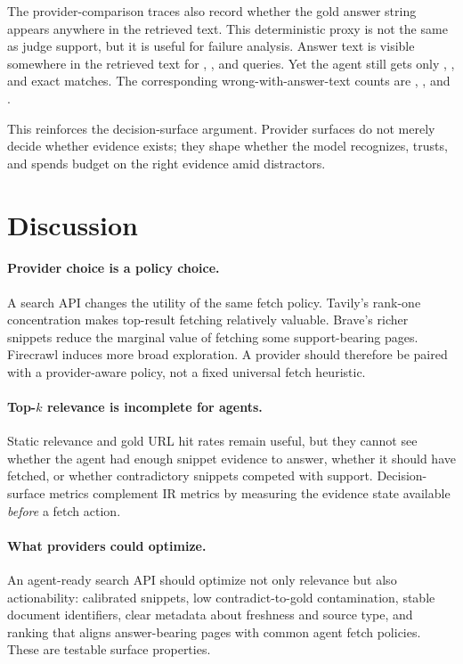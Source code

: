 The provider-comparison traces also record whether the gold answer string appears anywhere in the retrieved text. This deterministic proxy is not the same as judge support, but it is useful for failure analysis. Answer text is visible somewhere in the retrieved text for \BraveAnswerAvailable{}, \TavilyAnswerAvailable{}, and \FirecrawlAnswerAvailable{} queries. Yet the agent still gets only \BraveEM{}, \TavilyEM{}, and \FirecrawlEM{} exact matches. The corresponding wrong-with-answer-text counts are \BraveWrongWithAnswer{}, \TavilyWrongWithAnswer{}, and \FirecrawlWrongWithAnswer{}.

This reinforces the decision-surface argument. Provider surfaces do not merely decide whether evidence exists; they shape whether the model recognizes, trusts, and spends budget on the right evidence amid distractors.

\section{Discussion}
\label{sec:discussion}

\paragraph{Provider choice is a policy choice.}
A search API changes the utility of the same fetch policy. Tavily's rank-one concentration makes top-result fetching relatively valuable. Brave's richer snippets reduce the marginal value of fetching some support-bearing pages. Firecrawl induces more broad exploration. A provider should therefore be paired with a provider-aware policy, not a fixed universal fetch heuristic.

\paragraph{Top-$k$ relevance is incomplete for agents.}
Static relevance and gold URL hit rates remain useful, but they cannot see whether the agent had enough snippet evidence to answer, whether it should have fetched, or whether contradictory snippets competed with support. Decision-surface metrics complement IR metrics by measuring the evidence state available \emph{before} a fetch action.

\paragraph{What providers could optimize.}
An agent-ready search API should optimize not only relevance but also actionability: calibrated snippets, low contradict-to-gold contamination, stable document identifiers, clear metadata about freshness and source type, and ranking that aligns answer-bearing pages with common agent fetch policies. These are testable surface properties.

